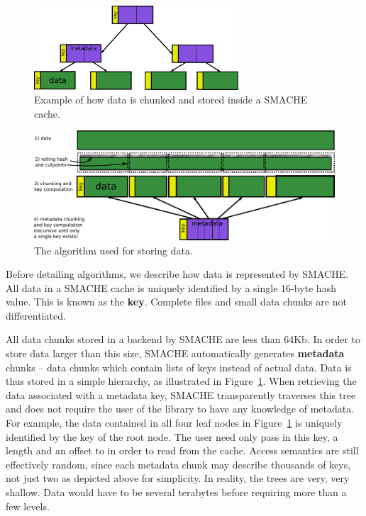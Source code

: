 \documentclass{sigplanconf}[11pt]
\begin{document}
\begin{figure}[h]
\begin{center}
\includegraphics[width=3in]{tree}
\caption{\label{fig:tree}Example of how data is chunked and stored inside a SMACHE cache.}
\end{center}
\end{figure}

\begin{figure}[htb]
\begin{center}
\includegraphics[width=5in]{algo}
\caption{\label{fig:algo} The algorithm used for storing data.}
\end{center}
\end{figure}

Before detailing algorithms, we describe how data is represented by SMACHE.
All data in a SMACHE cache is uniquely identified by a single 16-byte hash
value.  This is known as the {\bf key}.  Complete files and small data chunks
are not differentiated.

All data chunks stored in a backend by SMACHE are less than 64Kb.  In order to
store data larger than this size, SMACHE automatically generates {\bf metadata}
chunks -- data chunks which contain lists of keys instead of actual data.  Data
is thus stored in a simple hierarchy, as illustrated in Figure~\ref{fig:tree}.
When retrieving the data associated with a metadata key, SMACHE transparently
traverses this tree and does not require the user of the library to have any
knowledge of metadata.  For example, the data contained in all four leaf nodes
in Figure~\ref{fig:tree} is uniquely identified by the key of the root node.
The user need only pass in this key, a length and an offset to in order to read
from the cache.  Access semantics are still effectively random, since each
metadata chunk may describe thousands of keys, not just two as depicted above
for simplicity.  In reality, the trees are very, very shallow.  Data would have
to be several terabytes before requiring more than a few levels.
\end{document}
